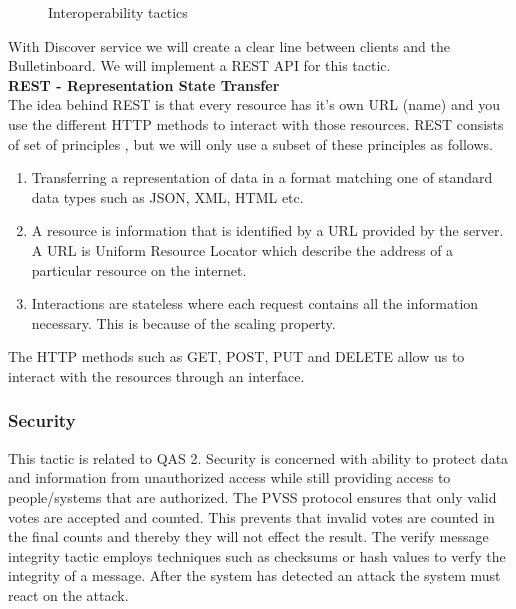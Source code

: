 \begin{figure}[H]
\centering
  \caption{Interoperability tactics \cite{Bass}}   
\end{figure}


\noindent
With Discover service we will create a clear line between clients and the Bulletinboard. We will implement a REST API for this tactic.\\

\noindent
\textbf{REST - Representation State Transfer}\\
The idea behind REST is that every resource has it’s own URL (name) and you use the different HTTP methods to interact with those resources. REST consists of set of principles \cite{Fielding}, but we will only use a subset of these principles as follows.

\begin{enumerate}
    \item Transferring a representation of data in a format matching one of standard data types such as JSON, XML, HTML etc.
    \item A resource is information that is identified by a URL provided by the server. A URL is Uniform Resource Locator which describe the address of a particular resource on the internet.
    \item Interactions are stateless where each request contains all the information necessary. This is because of the scaling property.
\end{enumerate}


\noindent
The HTTP methods such as GET, POST, PUT and DELETE allow us to interact with the resources through an interface.



\noindent
\subsubsection{Security}
This tactic is related to QAS 2. Security is concerned with ability to protect data and information from unauthorized access while still providing access to people/systems that are authorized. The PVSS protocol ensures that only valid votes are accepted and counted. This prevents that invalid votes are counted in the final counts and thereby they will not effect the result. The verify message integrity tactic employs techniques such as checksums or hash values to verfy the integrity of a message. After the system has detected an attack the system must react on the attack.



